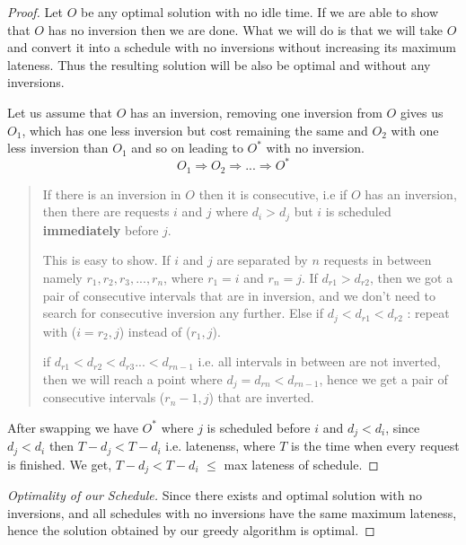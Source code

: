 \documentclass{article}
\theoremstyle{definition}
\begin{document}
\begin{proof}
Let $O$ be any optimal solution with no idle time. If we are able to 
show that $O$ has no inversion then we are done. What we will do is 
that we will take $O$ and convert it into a schedule with no inversions
without increasing its maximum lateness. Thus the resulting solution
will be also be optimal and without any inversions.

Let us assume that $O$ has an inversion,
removing one inversion from $O$ gives us $O_1$, which has one less 
inversion but cost remaining the same and $O_2$ with one less inversion 
than $O_1$ and so on leading to $O^*$ with no inversion.        
\[ O_1 \Rightarrow O_2 \Rightarrow ... \Rightarrow O^* \]

\begin{quote}
If there is an inversion in $O$ then it is consecutive, i.e 
if $O$ has an inversion, then there are requests $i$ and $j$ where
$d_i > d_j$ but $i$ is scheduled \textbf{immediately} before $j$. 

This is easy to show.
If $i$ and $j$ are separated by $n$ requests in between namely 
$r_1, r_2, r_3, ... , r_n$, where $r_1 = i$ and $r_n = j$.
If $d_{r1} > d_{r2}$, 
then we got a pair of consecutive intervals that are in inversion,
and we don't need to search for consecutive inversion any further.
Else if $d_j < d_{r1} < d_{r2}$ : repeat with ($i = r_2 , j$) 
instead of ($r_1 , j $).

if $d_{r1} < d_{r2} < d_{r3} ... < d_{rn-1}$ i.e. all intervals
in between are not inverted, then we will reach a point where
$d_j = d_{rn} < d_{rn-1}$, hence we get a pair of consecutive 
intervals ($r_n-1, j$) that are inverted. 
\end{quote}

\vspace{0.1in}

After swapping we have $O^*$ where $j$ is scheduled before $i$ and
$d_j < d_i$, since $d_j < d_i$ then $T - d_j <  T - d_i$ i.e. latenenss,
where $T$ is the time when every request is finished. We get, 
$T - d_j <  T - d_i$ $\leq$ max lateness of schedule.
\end{proof}

\begin{proof}[Optimality of our Schedule]
    Since there exists and optimal solution with no inversions, and
    all schedules with no inversions have the same maximum lateness,
    hence the solution obtained by our greedy algorithm is optimal.
\end{proof}
\end{document}

